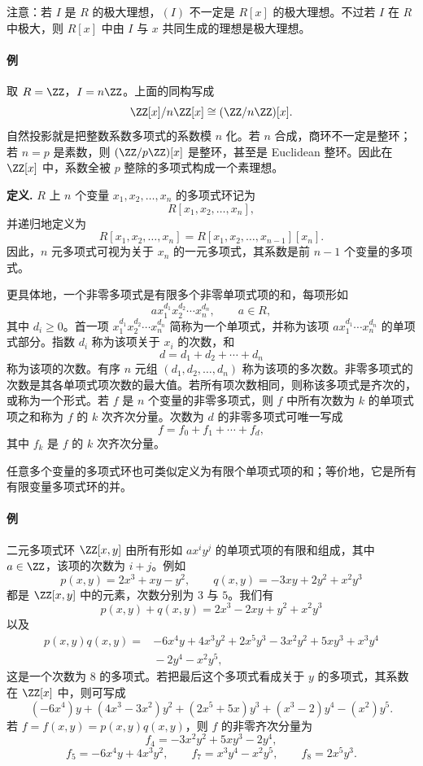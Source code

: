 注意：若 $I$ 是 $R$ 的极大理想，$(I)$ 不一定是 $R[x]$ 的极大理想。不过若 $I$ 在 $R$ 中极大，则 $R[x]$ 中由 $I$ 与 $x$ 共同生成的理想是极大理想。

\paragraph{例}
取 $R=\ZZ$，$I=n\ZZ$。上面的同构写成
\[
\ZZ[x]/n\ZZ[x]\cong (\ZZ/n\ZZ)[x].
\]
自然投影就是把整数系数多项式的系数模 $n$ 化。若 $n$ 合成，商环不一定是整环；若 $n=p$ 是素数，则 $(\ZZ/p\ZZ)[x]$ 是整环，甚至是 Euclidean 整环。因此在 $\ZZ[x]$ 中，系数全被 $p$ 整除的多项式构成一个素理想。

\noindent\textbf{定义.} $R$ 上 $n$ 个变量 $x_1,x_2,\ldots,x_n$ 的多项式环记为
\[
R[x_1,x_2,\ldots,x_n],
\]
并递归地定义为
\[
R[x_1,x_2,\ldots,x_n]=R[x_1,x_2,\ldots,x_{n-1}][x_n].
\]
因此，$n$ 元多项式可视为关于 $x_n$ 的一元多项式，其系数是前 $n-1$ 个变量的多项式。

更具体地，一个非零多项式是有限多个非零单项式项的和，每项形如
\[
a x_1^{d_1}x_2^{d_2}\cdots x_n^{d_n},
\qquad a\in R,
\]
其中 $d_i\geq0$。首一项 $x_1^{d_1}x_2^{d_2}\cdots x_n^{d_n}$ 简称为一个单项式，并称为该项 $a x_1^{d_1}\cdots x_n^{d_n}$ 的单项式部分。指数 $d_i$ 称为该项关于 $x_i$ 的次数，和
\[
d=d_1+d_2+\cdots+d_n
\]
称为该项的次数。有序 $n$ 元组 $(d_1,d_2,\ldots,d_n)$ 称为该项的多次数。非零多项式的次数是其各单项式项次数的最大值。若所有项次数相同，则称该多项式是齐次的，或称为一个形式。若 $f$ 是 $n$ 个变量的非零多项式，则 $f$ 中所有次数为 $k$ 的单项式项之和称为 $f$ 的 $k$ 次齐次分量。次数为 $d$ 的非零多项式可唯一写成
\[
f=f_0+f_1+\cdots+f_d,
\]
其中 $f_k$ 是 $f$ 的 $k$ 次齐次分量。

任意多个变量的多项式环也可类似定义为有限个单项式项的和；等价地，它是所有有限变量多项式环的并。

\paragraph{例}
二元多项式环 $\ZZ[x,y]$ 由所有形如 $a x^i y^j$ 的单项式项的有限和组成，其中 $a\in\ZZ$，该项的次数为 $i+j$。例如
\[
p(x,y)=2x^3+xy-y^2,
\qquad
q(x,y)=-3xy+2y^2+x^2y^3
\]
都是 $\ZZ[x,y]$ 中的元素，次数分别为 $3$ 与 $5$。我们有
\[
p(x,y)+q(x,y)=2x^3-2xy+y^2+x^2y^3
\]
以及
\[
\begin{aligned}
p(x,y)q(x,y)= {}& -6x^4y+4x^3y^2+2x^5y^3-3x^2y^2+5xy^3+x^3y^4 \\
&{}-2y^4-x^2y^5,
\end{aligned}
\]
这是一个次数为 $8$ 的多项式。若把最后这个多项式看成关于 $y$ 的多项式，其系数在 $\ZZ[x]$ 中，则可写成
\[
(-6x^4)y+(4x^3-3x^2)y^2+(2x^5+5x)y^3+(x^3-2)y^4-(x^2)y^5.
\]
若 $f=f(x,y)=p(x,y)q(x,y)$，则 $f$ 的非零齐次分量为
\[
f_4=-3x^2y^2+5xy^3-2y^4,
\]
\[
f_5=-6x^4y+4x^3y^2,
\qquad
f_7=x^3y^4-x^2y^5,
\qquad
f_8=2x^5y^3.
\]

